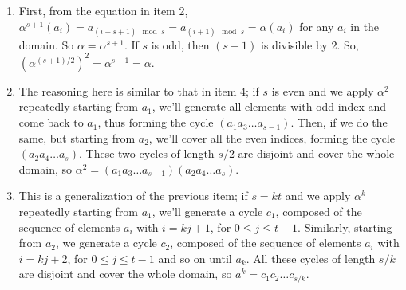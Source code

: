 \documentclass{article}
\begin{document}
\begin{enumerate}
    \item First, from the equation in item 2, $\alpha^{s + 1}(a_i) = a_{(i + s + 1) \mod s} = a_{(i + 1) \mod s} = \alpha(a_i)$ for any $a_i$ in the domain. So $\alpha = \alpha^{s + 1}$. If $s$ is odd, then $(s + 1)$ is divisible by 2. So, $(\alpha^{(s + 1)/2})^2 = \alpha^{s + 1} = \alpha$.
    
    \item The reasoning here is similar to that in item 4; if $s$ is even and we apply $\alpha^2$ repeatedly starting from $a_1$, we'll generate all elements with odd index and come back to $a_1$, thus forming the cycle $(a_1a_3\ldots a_{s-1})$. Then, if we do the same, but starting from $a_2$, we'll cover all the even indices, forming the cycle $(a_2a_4\ldots a_s)$. These two cycles of length $s/2$ are disjoint and cover the whole domain, so $\alpha^2 = (a_1a_3\ldots a_{s-1})(a_2a_4\ldots a_s)$.

    \item This is a generalization of the previous item; if $s = kt$ and we apply $\alpha^k$ repeatedly starting from $a_1$, we'll generate a cycle $c_1$, composed of the sequence of elements $a_i$ with $i = kj + 1$, for $0 \leqslant j \leqslant t - 1$. Similarly, starting from $a_2$, we generate a cycle $c_2$, composed of the sequence of elements $a_i$ with $i = kj + 2$, for $0 \leqslant j \leqslant t - 1$ and so on until $a_k$. All these cycles of length $s/k$ are disjoint and cover the whole domain, so $a^k = c_1c_2\ldots c_{s/k}$.
\end{enumerate}
\end{document}
